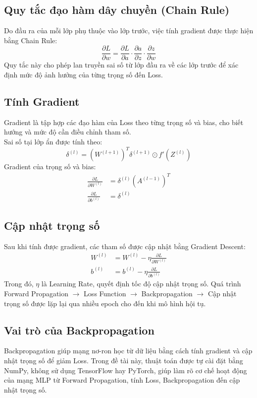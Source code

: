 \documentclass[12pt,a4paper]{report}
\begin{document}
\subsection{Quy tắc đạo hàm dây chuyền (Chain Rule)}
Do đầu ra của mỗi lớp phụ thuộc vào lớp trước, việc tính gradient được thực hiện bằng Chain Rule:
\begin{equation}
    \frac{\partial L}{\partial w} = \frac{\partial L}{\partial a} \cdot \frac{\partial a}{\partial z} \cdot \frac{\partial z}{\partial w}
\end{equation}
Quy tắc này cho phép lan truyền sai số từ lớp đầu ra về các lớp trước để xác định mức độ ảnh hưởng của từng trọng số đến Loss.

\subsection{Tính Gradient}
Gradient là tập hợp các đạo hàm của Loss theo từng trọng số và bias, cho biết hướng và mức độ cần điều chỉnh tham số. \\
Sai số tại lớp ẩn được tính theo:
\begin{equation}
    \delta^{(l)} = (W^{(l+1)})^T \delta^{(l+1)} \odot f'(Z^{(l)})
\end{equation}
Gradient của trọng số và bias:
\begin{align}
    \frac{\partial L}{\partial W^{(l)}} &= \delta^{(l)} (A^{(l-1)})^T \\
    \frac{\partial L}{\partial b^{(l)}} &= \delta^{(l)}
\end{align}

\subsection{Cập nhật trọng số}
Sau khi tính được gradient, các tham số được cập nhật bằng Gradient Descent:
\begin{align}
    W^{(l)} &= W^{(l)} - \eta \frac{\partial L}{\partial W^{(l)}} \\
    b^{(l)} &= b^{(l)} - \eta \frac{\partial L}{\partial b^{(l)}}
\end{align}
Trong đó, $\eta$ là Learning Rate, quyết định tốc độ cập nhật trọng số. Quá trình Forward Propagation $\rightarrow$ Loss Function $\rightarrow$ Backpropagation $\rightarrow$ Cập nhật trọng số được lặp lại qua nhiều epoch cho đến khi mô hình hội tụ.

\subsection{Vai trò của Backpropagation}
Backpropagation giúp mạng nơ-ron học từ dữ liệu bằng cách tính gradient và cập nhật trọng số để giảm Loss. Trong đề tài này, thuật toán được tự cài đặt bằng NumPy, không sử dụng TensorFlow hay PyTorch, giúp làm rõ cơ chế hoạt động của mạng MLP từ Forward Propagation, tính Loss, Backpropagation đến cập nhật trọng số.
\end{document}
